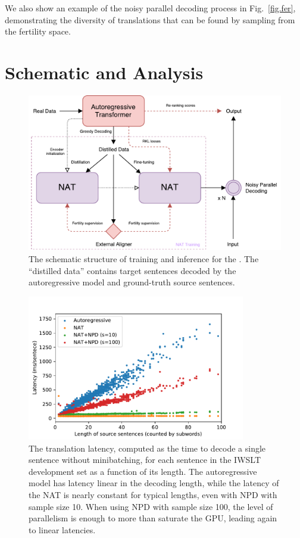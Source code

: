 We also show an example of the noisy parallel decoding process in Fig.~\ref{fig.fer}, demonstrating the diversity of translations that can be found by sampling from the fertility space.



\section{Schematic and Analysis}


\begin{figure}[htbp]
\centering
\includegraphics[width=\textwidth]{figs/nat/NAT-overall}
\caption{The schematic structure of training and inference for the \model. The ``distilled data'' contains target sentences decoded by the autoregressive model and ground-truth source sentences.}
\end{figure}

\begin{figure}[htbp]
\centering
\includegraphics[width=0.85\textwidth]{figs/nat/length_vs_latency}
\caption{The translation latency, computed as the time to decode a single sentence without minibatching, for each sentence in the IWSLT development set as a function of its length. The autoregressive model has latency linear in the decoding length, while the latency of the NAT is nearly constant for typical lengths, even with NPD with sample size 10. When using NPD with sample size 100, the level of parallelism is enough to more than saturate the GPU, leading again to linear latencies.}
\end{figure}

